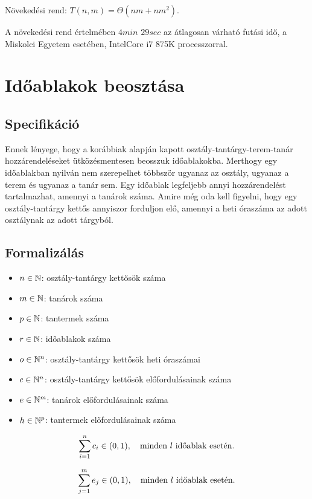 \documentclass[12pt,a4paper]{report}
\begin{document}
Növekedési rend: $T(n,m)=\Theta (nm+nm^2).$

A növekedési rend értelmében $4min$ $29sec$ az átlagosan várható futási idő, a Miskolci Egyetem esetében, IntelCore i7 875K processzorral. 

\section{Időablakok beosztása}

\subsection{Specifikáció}

Ennek lényege, hogy a korábbiak alapján kapott osztály-tantárgy-terem-tanár
hozzárendeléseket ütközésmentesen beosszuk időablakokba. Merthogy egy időablakban nyilván nem szerepelhet többször ugyanaz az osztály, ugyanaz a terem és ugyanaz a tanár sem. Egy időablak legfeljebb annyi hozzárendelést tartalmazhat, amennyi a tanárok száma. Amire még oda kell figyelni, hogy egy osztály-tantárgy kettős annyiszor forduljon elő, amennyi a heti óraszáma az adott osztálynak az adott tárgyból.

\subsection{Formalizálás}

\begin{itemize}
    \item $n \in \Bbb{N}$: osztály-tantárgy kettősök száma
    \item $m \in \Bbb{N}$: tanárok száma
    \item $p \in \Bbb{N}$: tantermek száma
    \item $r \in \Bbb{N}$: időablakok száma
    \item $o \in \Bbb{N}^n$: osztály-tantárgy kettősök heti óraszámai
    \item $c \in \Bbb{N}^n$: osztály-tantárgy kettősök előfordulásainak száma
    \item $e \in \Bbb{N}^m$: tanárok előfordulásainak száma
    \item $h \in \Bbb{N}^p$: tantermek előfordulásainak száma
\end{itemize}

$$\sum_{i=1}^n c_i \in (0,1), \quad \hbox{minden }l\hbox{ időablak esetén.}$$

$$\sum_{j=1}^m e_j \in (0,1), \quad \hbox{minden }l\hbox{ időablak esetén.}$$
\end{document}
